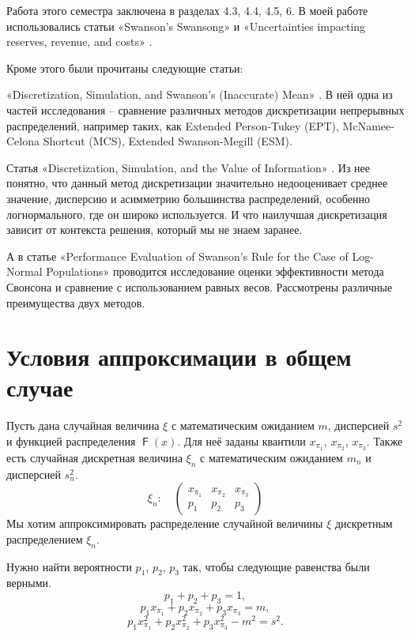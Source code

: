 \documentclass[12pt]{article}
\DeclareMathOperator{\F}{\mathsf{F}}
\begin{document}
	Работа этого семестра заключена в разделах 4.3, 4.4, 4.5, 6. В моей работе использовались статьи «Swanson's Swansong» \cite{Swansong} и «Uncertainties impacting reserves, revenue, and costs» \cite{Uncertainties}.
	
	Кроме этого были прочитаны следующие статьи:
	
	«Discretization, Simulation, and Swanson's (Inaccurate) Mean» \cite{Discretization}. В ней одна из частей исследования -- сравнение различных методов дискретизации непрерывных распределений, например таких, как Extended Person‐Tukey (EPT), McNamee‐Celona Shortcut (MCS), Extended Swanson‐Megill (ESM).
	
	Статья «Discretization, Simulation, and the Value of Information» \cite{Simulation}.
	Из нее понятно, что данный метод дискретизации значительно недооценивает среднее значение, дисперсию и асимметрию большинства распределений, особенно логнормального, где он широко используется. И что наилучшая дискретизация зависит от контекста решения, который мы не знаем заранее.
	
	А в статье «Performance Evaluation of Swanson’s Rule for the Case of Log-Normal Populations» \cite{Performance} проводится исследование оценки эффективности метода Свонсона и сравнение с использованием равных весов. Рассмотрены различные преимущества двух методов.
	
	\section{Условия аппроксимации в общем случае}
	
	Пусть дана случайная величина $\xi$ с математическим ожиданием $m$, дисперсией $s^{2}$ и функцией распределения $\F(x)$. Для неё заданы квантили $x_{\pi_{1}}$, $x_{\pi_{2}}$, $x_{\pi_{3}}$. Также есть случайная дискретная величина $\xi_{n}$ с математическим ожиданием $m_{n}$ и дисперсией $s^{2}_{n}$.
	\[\xi_{n}:\quad\begin{pmatrix} 
		x_{\pi_{1}}&x_{\pi_{2}}&x_{\pi_{3}}\\ 
		p_{1} &  p_{2}  & p_{3}
	\end{pmatrix}\]
	Мы хотим аппроксимировать распределение случайной величины $\xi$ дискретным распределением $\xi_{n}$.
	
	Нужно найти вероятности $p_{1}$, $p_{2}$, $p_{3}$ так, чтобы следующие равенства были верными.
	\begin{equation}
		p_{1} + p_{2} + p_{3} = 1, \label{1}
	\end{equation}
	\begin{equation}
		p_{1}x_{\pi_{1}} + p_{2}x_{\pi_{2}} + p_{3}x_{\pi_{3}} = m, \label{2}
	\end{equation}
	\begin{equation}
		p_{1} x_{\pi_{1}}^{2} + p_{2} x_{\pi_{2}}^{2} + p_{3} x_{\pi_{3}}^{2} - m^{2} = s^{2}. \label{3}
	\end{equation}
\end{document}
